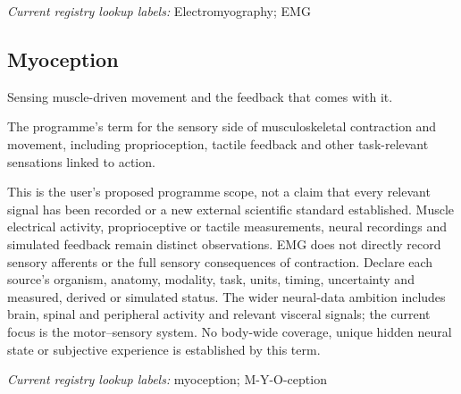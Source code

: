 \noindent\textit{Current registry lookup labels:} Electromyography; EMG\par

\subsection*{Myoception}
\noindent Sensing muscle-driven movement and the feedback that comes with it.\par
\noindent The programme’s term for the sensory side of musculoskeletal contraction and movement, including proprioception, tactile feedback and other task-relevant sensations linked to action.\par
\noindent This is the user’s proposed programme scope, not a claim that every relevant signal has been recorded or a new external scientific standard established. Muscle electrical activity, proprioceptive or tactile measurements, neural recordings and simulated feedback remain distinct observations. EMG does not directly record sensory afferents or the full sensory consequences of contraction. Declare each source’s organism, anatomy, modality, task, units, timing, uncertainty and measured, derived or simulated status. The wider neural-data ambition includes brain, spinal and peripheral activity and relevant visceral signals; the current focus is the motor–sensory system. No body-wide coverage, unique hidden neural state or subjective experience is established by this term.\par

\noindent\textit{Current registry lookup labels:} myoception; M-Y-O-ception\par

